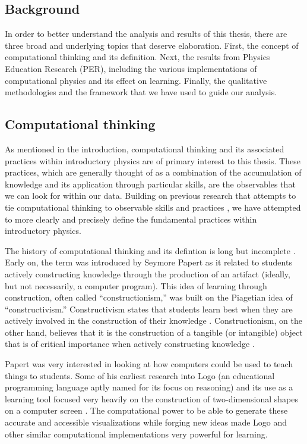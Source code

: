 \documentclass{msuphddissertation}
\begin{document}
\begin{doublespace}
%
%
%
%
%
%
%
%
%
%
%
%
%
%
%
%

\chapter{Background}\label{CH2:Background}

In order to better understand the analysis and results of this thesis, there are three broad and underlying topics that deserve elaboration.  First, the concept of computational thinking and its definition.  Next, the results from Physics Education Research (PER), including the various implementations of computational physics and its effect on learning.  Finally, the qualitative methodologies and the framework that we have used to guide our analysis.

\section{Computational thinking}

As mentioned in the introduction, computational thinking and its associated practices within introductory physics are of primary interest to this thesis.  These practices, which are generally thought of as a combination of the accumulation of knowledge and its  application through particular skills, are the observables that we can look for within our data.  Building on previous research that attempts to tie computational thinking to observable skills and practices \cite{AAPT2016,NGSS2012,Weintrop2015}, we have attempted to more clearly and precisely define the fundamental practices within introductory physics.

The history of computational thinking and its defintion is long but incomplete \cite{Papert1981,Papert1996,Wing2006,Wing2008,Aho2012,Grover2013,Bundy2007}.  Early on, the term was introduced by Seymore Papert as it related to students actively constructing knowledge through the production of an artifact (ideally, but not necessarily, a computer program).  This idea of learning through construction, often called ``constructionism,'' was built on the Piagetian idea of ``constructivism.''  Constructivism states that students learn best when they are actively involved in the construction of their knowledge \cite{Piaget1963}.  Constructionism, on the other hand, believes that it is the construction of a tangible (or intangible) object that is of critical importance when actively constructing knowledge \cite{Papert1981}.

Papert was very interested in looking at how computers could be used to teach things to students.  Some of his earliest research into Logo (an educational programming language aptly named for its focus on reasoning) and its use as a learning tool focused very heavily on the construction of two-dimensional shapes on a computer screen \cite{Papert1972}.  The computational power to be able to generate these accurate and accessible visualizations while forging new ideas made Logo and other similar computational implementations very powerful for learning.
 

\end{doublespace}
\end{document}
